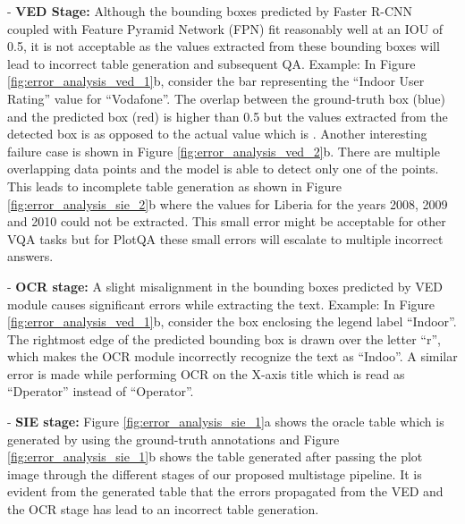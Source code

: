 \documentclass[10pt,twocolumn,letterpaper]{article}
\begin{document}
- \textbf{VED Stage:} Although the bounding boxes predicted by Faster R-CNN coupled with Feature Pyramid Network (FPN) fit reasonably well at an IOU of 0.5, it is not acceptable as the values extracted from these bounding boxes will lead to incorrect table generation and subsequent QA. Example: In Figure \ref{fig:error_analysis_ved_1}b, consider the bar representing the ``Indoor User Rating'' value for ``Vodafone''. The overlap between the ground-truth box (blue) and the predicted box (red) is higher than 0.5 but the values extracted from the detected box is  as opposed to the actual value which is . Another interesting failure case is shown in Figure \ref{fig:error_analysis_ved_2}b. There are multiple overlapping data points and the model is able to detect only one of the points. This leads to incomplete table generation as shown in Figure \ref{fig:error_analysis_sie_2}b where the values for Liberia for the years 2008, 2009 and 2010 could not be extracted. This small error might be acceptable for other VQA tasks but for PlotQA these small errors will escalate to multiple incorrect answers.

- \textbf{OCR stage:}
A slight misalignment in the bounding boxes predicted by VED module causes significant errors while extracting the text.
Example: In Figure \ref{fig:error_analysis_ved_1}b, consider the box enclosing the legend label ``Indoor''. The rightmost edge of the predicted bounding box is drawn over the letter ``r'', which makes the OCR module incorrectly recognize the text as ``Indoo''. A similar error is made while performing OCR on the X-axis title which is read as ``Dperator'' instead of ``Operator''. 

- \textbf{SIE stage:} Figure \ref{fig:error_analysis_sie_1}a shows the oracle table which is generated by using the ground-truth annotations and Figure \ref{fig:error_analysis_sie_1}b shows the table generated after passing the plot image through the different stages of our proposed multistage pipeline. It is evident from the generated table that the errors propagated from the VED and the OCR stage has lead to an incorrect table generation.
\end{document}
